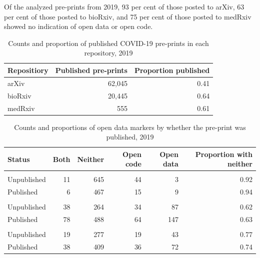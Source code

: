 \documentclass[
]{article}
\begin{document}
Of the analyzed pre-prints from 2019, 93 per cent of those posted to arXiv, 63 per cent of those posted to bioRxiv, and 75 per cent of those posted to medRxiv showed no indication of open data or open code.

\begin{table}

\caption{\label{tab:2019-published}Counts and proportion of published COVID-19 pre-prints in each repository, 2019}
\centering
\begin{tabular}[t]{lrr}
\toprule
Repositiory & Published pre-prints & Proportion published\\
\midrule
arXiv & 62,045 & 0.41\\
bioRxiv & 20,445 & 0.64\\
medRxiv & 555 & 0.61\\
\bottomrule
\end{tabular}
\end{table}

\begin{table}

\caption{\label{tab:2019-open-publishing}Counts and proportions of open data markers by whether the pre-print was published, 2019}
\centering
\begin{tabular}[t]{lrrrrr}
\toprule
Status & Both & Neither & Open code & Open data & Proportion with neither\\
\midrule
\addlinespace[0.3em]
\multicolumn{6}{l}{\textbf{arXiv}}\\
\hspace{1em}Unpublished & 11 & 645 & 44 & 3 & 0.92\\
\hspace{1em}Published & 6 & 467 & 15 & 9 & 0.94\\
\addlinespace[0.3em]
\multicolumn{6}{l}{\textbf{bioRxiv}}\\
\hspace{1em}Unpublished & 38 & 264 & 34 & 87 & 0.62\\
\hspace{1em}Published & 78 & 488 & 64 & 147 & 0.63\\
\addlinespace[0.3em]
\multicolumn{6}{l}{\textbf{medRxiv}}\\
\hspace{1em}Unpublished & 19 & 277 & 19 & 43 & 0.77\\
\hspace{1em}Published & 38 & 409 & 36 & 72 & 0.74\\
\bottomrule
\end{tabular}
\end{table}
\end{document}

